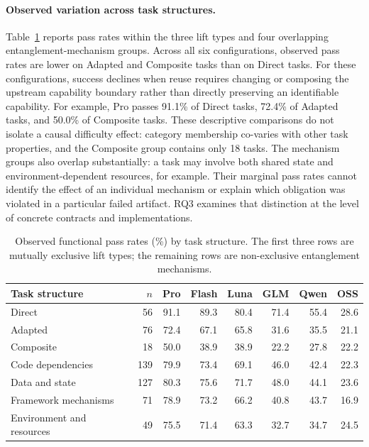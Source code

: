 \documentclass[acmsmall,screen,review,anonymous]{acmart}
\begin{document}
\paragraph{Observed variation across task structures.}
Table~\ref{tab:structure} reports pass rates within the three lift types
and four overlapping entanglement-mechanism groups. Across all six configurations, observed pass rates are lower on Adapted
and Composite tasks than on Direct tasks.
For these configurations, success declines when reuse requires changing or
composing the upstream capability boundary rather than directly preserving an
identifiable capability. For example, Pro passes 91.1\% of Direct tasks,
72.4\% of Adapted tasks, and 50.0\% of Composite tasks.
These descriptive comparisons do not isolate a causal difficulty effect:
category membership co-varies with other task properties, and the Composite
group contains only 18 tasks.
The mechanism groups also overlap substantially: a task may involve both shared
state and environment-dependent resources, for example. Their marginal pass rates
cannot identify the effect of an individual mechanism or explain which obligation
was violated in a particular failed artifact. RQ3 examines that distinction at
the level of concrete contracts and implementations.


\begin{table}[htb]
  \centering
  \footnotesize
  \caption{Observed functional pass rates (\%) by task structure.
  The first three rows are mutually exclusive lift types; the remaining
  rows are non-exclusive entanglement mechanisms.}
  \label{tab:structure}

  \setlength{\tabcolsep}{5.0pt}
  \renewcommand{\arraystretch}{1.10}

  \begin{tabular}{@{}l r @{\hspace{6pt}} rrrrrr@{}}
    \toprule
    \textbf{Task structure}
      & \textbf{$n$}
      & \textbf{Pro}
      & \textbf{Flash}
      & \textbf{Luna}
      & \textbf{GLM}
      & \textbf{Qwen}
      & \textbf{OSS} \\
    \midrule

    Direct                    & 56  & 91.1 & 89.3 & 80.4 & 71.4 & 55.4 & 28.6 \\
    Adapted                   & 76  & 72.4 & 67.1 & 65.8 & 31.6 & 35.5 & 21.1 \\
    Composite                 & 18  & 50.0 & 38.9 & 38.9 & 22.2 & 27.8 & 22.2 \\

    \midrule

    Code dependencies         & 139 & 79.9 & 73.4 & 69.1 & 46.0 & 42.4 & 22.3 \\
    Data and state            & 127 & 80.3 & 75.6 & 71.7 & 48.0 & 44.1 & 23.6 \\
    Framework mechanisms      & 71  & 78.9 & 73.2 & 66.2 & 40.8 & 43.7 & 16.9 \\
    Environment and resources & 49  & 75.5 & 71.4 & 63.3 & 32.7 & 34.7 & 24.5 \\

    \bottomrule
  \end{tabular}
\end{table}
\end{document}
